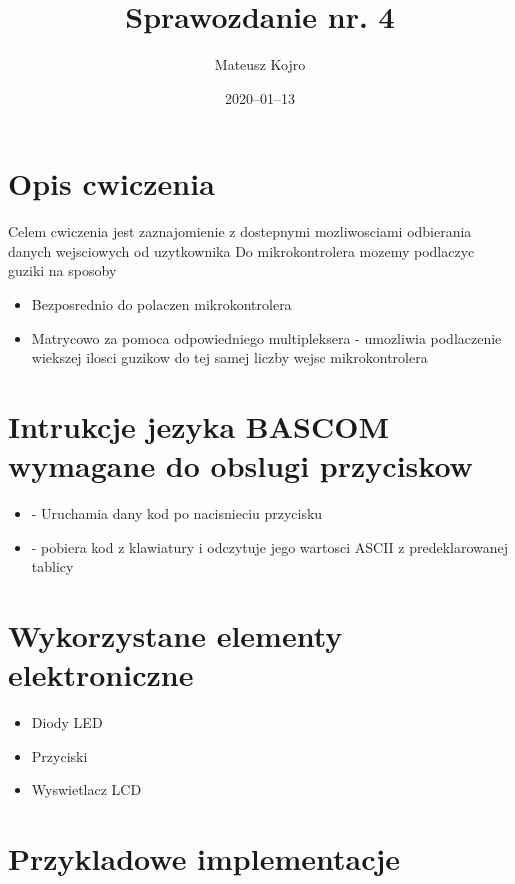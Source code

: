 \documentclass{article}
\title{Sprawozdanie nr. 4}
\author{Mateusz Kojro}
\date{2020–01–13}
\begin{document}
\maketitle

\section{Opis cwiczenia}

Celem cwiczenia jest zaznajomienie z dostepnymi mozliwosciami odbierania danych wejsciowych od uzytkownika
Do mikrokontrolera mozemy podlaczyc guziki na sposoby

\begin{itemize}
  \item Bezposrednio do polaczen mikrokontrolera
  \item Matrycowo za pomoca odpowiedniego multipleksera - umozliwia podlaczenie wiekszej ilosci guzikow do tej samej liczby wejsc mikrokontrolera
\end{itemize}

\section{Intrukcje jezyka BASCOM wymagane do obslugi przyciskow}

\begin{itemize}
  \item {} - Uruchamia dany kod po nacisnieciu przycisku
  \item {} - pobiera kod z klawiatury i odczytuje jego wartosci ASCII z predeklarowanej tablicy 
\end{itemize}

\section{Wykorzystane elementy elektroniczne}

\begin{itemize}
  \item Diody LED
  \item Przyciski
  \item Wyswietlacz LCD
\end{itemize}


\section{Przykladowe implementacje}
\end{document}
